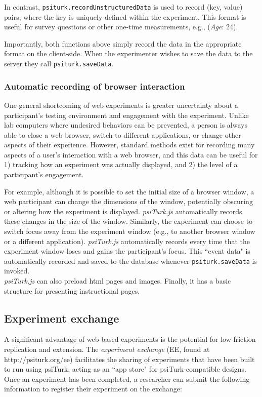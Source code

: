 \documentclass[twocolumn]{svjour3}          %
\begin{document}
In contrast, \texttt{psiturk.recordUnstructuredData} is used to record (key, value) pairs, where the key is uniquely defined within the experiment.
This format is useful for survey questions or other one-time measurements, e.g., (\emph{Age}: 24).

Importantly, both functions above simply record the data in the appropriate format on the client-side.
When the experimenter wishes to save the data to the server they call \texttt{psiturk.saveData}.

\subsubsection{Automatic recording of browser interaction}
 
One general shortcoming of web experiments is greater uncertainty about a participant's testing environment and engagement with the experiment.
Unlike lab computers where undesired behaviors can be prevented, a person is always able to close a web browser, switch to different applications, or change other aspects of their experience.
However, standard methods exist for recording many aspects of a user's interaction with a web browser, and this data can be useful for 1) tracking how an experiment was actually displayed, and 2) the level of a participant's engagement.

For example, although it is possible to set the initial size of a browser window, a web participant can change the dimensions of the window, potentially obscuring or altering how the experiment is displayed.
\emph{psiTurk.js} automatically records these changes in the size of the window.
Similarly, the experiment can choose to switch focus away from the experiment window (e.g., to another browser window or a different application).
\emph{psiTurk.js} automatically records every time that the experiment window loses and gains the participant's focus.
This ``event data" is automatically recorded and saved to the database whenever \texttt{psiturk.saveData} is invoked. \\


\emph{psiTurk.js} can also preload html pages and images.
Finally, it has a basic structure for presenting instructional pages.

\subsection{Experiment exchange}

A significant advantage of web-based experiments is the potential for low-friction replication and extension. 
The \emph{experiment exchange} (EE, found at http://psiturk.org/ee) facilitates the sharing of experiments that have been built to run using psiTurk, acting as an ``app store" for psiTurk-compatible designs.
Once an experiment has been completed, a researcher can submit the following information to register their experiment on the exchange:
\end{document}
